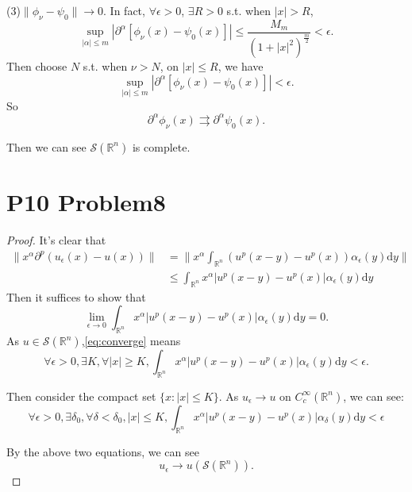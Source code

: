 \documentclass[a4paper]{ctexart}
\newcommand{\dif}{\mathrm{d}}
\begin{document}
(3)$\|\phi_{\nu}-\psi_{0}\|\rightarrow 0$. In fact, $\forall\epsilon>0$, $\exists R>0$ s.t. when $|x|>R$,
\begin{equation}
    \sup_{|\alpha|\le m}|\partial^{\alpha}[\phi_{\nu}(x)-\psi_{0}(x)]|\le\frac{M_{m}}{(1+|x|^{2})^{\frac{m}{2}}}<\epsilon.
\end{equation}
Then choose $N$ s.t. when $\nu>N$, on $|x|\le R$, we have 
\begin{equation}
    \sup_{|\alpha|\le m}|\partial^{\alpha}[\phi_{\nu}(x)-\psi_{0}(x)]|<\epsilon.
\end{equation}
So 
\begin{equation}
    \partial^{\alpha}\phi_{\nu}(x)\rightrightarrows\partial^{\alpha}\psi_{0}(x).
\end{equation}

Then we can see $\mathscr{S}(\mathbb{R}^{n})$ is complete.
\section*{P10 Problem8}
\begin{proof}
    It's clear that 
    \begin{equation}
        \begin{aligned}
            \|x^{\alpha}\partial^{p}(u_{\epsilon}(x)-u(x))\|&=\|x^{\alpha}\int_{\mathbb{R}^{n}}(u^p(x-y)-u^{p}(x))\alpha_{\epsilon}(y)\dif y\|\\
            &\le\int_{\mathbb{R}^{n}}x^{\alpha}|u^{p}(x-y)-u^{p}(x)|\alpha_{\epsilon}(y)\dif y
        \end{aligned}
    \end{equation}
    Then it suffices to show that 
    \begin{equation}
        \label{eq:converge}
        \lim_{\epsilon\rightarrow 0}\int_{\mathbb{R}^{n}}x^{\alpha}|u^{p}(x-y)-u^{p}(x)|\alpha_{\epsilon}(y)\dif y=0.
    \end{equation}
    As $u\in\mathscr{S}(\mathbb{R}^{n})$,\eqref{eq:converge} means 
    \begin{equation}
        \forall \epsilon>0, \exists K,\forall |x|\ge K, 
        \int_{\mathbb{R}^{n}}x^{\alpha}|u^{p}(x-y)-u^{p}(x)|\alpha_{\epsilon}(y)\dif y<\epsilon.
    \end{equation}

    Then consider the compact set $\{x:|x|\le K\}$. As $u_{\epsilon}\rightarrow u$ on $C_{c}^{\infty}(\mathbb{R}^{n})$, we can see:
    \begin{equation}
        \forall\epsilon>0,\exists\delta_{0},\forall\delta<\delta_{0},|x|\le K,
        \int_{\mathbb{R}^{n}}x^{\alpha}|u^{p}(x-y)-u^{p}(x)|\alpha_{\delta}(y)\dif y<\epsilon
    \end{equation}

    By the above two equations, we can see 
    \begin{equation}
        u_{\epsilon}\rightarrow u(\mathscr{S}(\mathbb{R}^{n})).
    \end{equation}
\end{proof}
\end{document}

